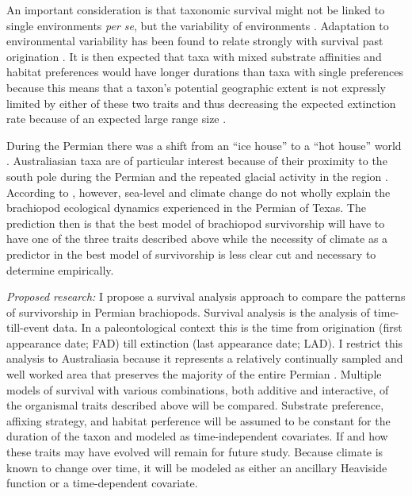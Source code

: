 \documentclass[12pt,letterpaper]{article}
\begin{document}
An important consideration is that taxonomic survival might not be linked to single environments \textit{per se}, but the variability of environments \citep{Foote2013,Heim2011,Liow2007b}. Adaptation to environmental variability has been found to relate strongly with survival past origination \citep{Foote2013}. It is then expected that taxa with mixed substrate affinities and habitat preferences would have longer durations than taxa with single preferences because this means that a taxon's potential geographic extent is not expressly limited by either of these two traits and thus decreasing the expected extinction rate because of an expected large range size \citep{Jablonski1986,Harnik2013,Nurnberg2013a,Jablonski2003,Roy2009c}. 

During the Permian there was a shift from an ``ice house'' to a ``hot house'' world \citep{Fielding2006,Birgenheier2010,Jones2006,Powell2007}. Australiasian taxa are of particular interest because of their proximity to the south pole during the Permian and the repeated glacial activity in the region \citep{Fielding2006,Birgenheier2010,Jones2006}. According to \citet{Olszewski2004}, however, sea-level and climate change do not wholly explain the brachiopod ecological dynamics experienced in the Permian of Texas. The prediction then is that the best model of brachiopod survivorship will have to have one of the three traits described above while the necessity of climate as a predictor in the best model of survivorship is less clear cut and necessary to determine empirically.


\textit{Proposed research:}
I propose a survival analysis approach to compare the patterns of survivorship in Permian brachiopods. Survival analysis is the analysis of time-till-event data. In a paleontological context this is the time from origination (first appearance date; FAD) till extinction (last appearance date; LAD). I restrict this analysis to Australiasia because it represents a relatively continually sampled and well worked area that preserves the majority of the entire Permian \citep{Clapham2012,Clapham2008a,Waterhouse1987,Archbold1995}. Multiple models of survival with various combinations, both additive and interactive, of the organismal traits described above will be compared. Substrate preference, affixing strategy, and habitat perference will be assumed to be constant for the duration of the taxon and modeled as time-independent covariates. If and how these traits may have evolved will remain for future study. Because climate is known to change over time, it will be modeled as either an ancillary Heaviside function or a time-dependent covariate.
\end{document}
